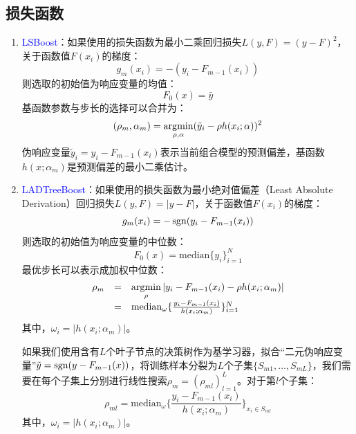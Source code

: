 \subsection{损失函数}
\begin{enumerate}[（1）]
  \item \textcolor{blue}{LSBoost}：如果使用的损失函数为最小二乘回归损失$L(y,F)=(y-F)^2$，关于函数值$F(x_i)$的梯度：
    \begin{equation}
        g_m(x_i) = -(y_i - F_{m-1}(x_i))
    \end{equation}
    则选取的初始值为响应变量的均值：
    \begin{equation}
        F_0(x) = \bar{y}
    \end{equation}
    基函数参数与步长的选择可以合并为：
    \begin{equation}
        (\rho_m,\alpha_m) = \operatorname*{\mathrm{\arg\!\min}}\limits_{\rho,\alpha} (\tilde{y}_i - \rho h(x_i;\alpha))^2
    \end{equation}
    伪响应变量$\tilde{y}_i=y_i - F_{m-1}(x_i)$表示当前组合模型的预测偏差，基函数$h(x;\alpha_m)$是预测偏差的最小二乘估计。
  \item \textcolor{blue}{LADTreeBoost}：如果使用的损失函数为最小绝对值偏差（Least Absolute Derivation）回归损失$L(y,F) = |y-F|$，关于函数值$F(x_i)$的梯度：
    \begin{equation}
        g_m(x_i) = -\operatorname{\mathrm{sgn}}(y_i - F_{m-1}(x_i))
    \end{equation}
    则选取的初始值为响应变量的中位数：
    \begin{equation}
        F_0(x) = \text{median}\{y_i\}_{i=1}^N
    \end{equation}
    最优步长可以表示成加权中位数：
    \begin{equation}
        \begin{array}{lll}
          \rho_m & = & \operatorname*{\mathrm{\arg\!\min}}\limits_{\rho} |y_i - F_{m-1}(x_i) - \rho h(x_i;\alpha_m)| \\
            & = & \text{median}_\omega \{\frac{y_i - F_{m-1}(x_i)}{h(x_i;\alpha_m)}\}_{i=1}^N
        \end{array}
    \end{equation}
    其中，$\omega_i=|h(x_i;\alpha_m)|$。

    如果我们使用含有$L$个叶子节点的决策树作为基学习器，拟合“二元伪响应变量”$\tilde{y}=\operatorname{\mathrm{sgn}}(y - F_{m-1}(x))$，将训练样本分裂为$L$个子集$\{S_{m1},\ldots,S_{mL}\}$，我们需要在每个子集上分别进行线性搜索$\rho_m=(\rho_{ml})_{l=1}^L$。对于第$l$个子集：
    \begin{equation}
        \rho_{ml} = \text{median}_\omega \{\frac{y_i - F_{m-1}(x_i)}{h(x_i;\alpha_m)}\}_{x_i\in S_{ml}}
    \end{equation}
    其中，$\omega_i=|h(x_i;\alpha_m)|$。


\end{enumerate}
